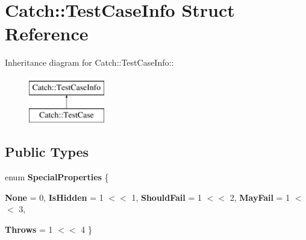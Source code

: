 \hypertarget{structCatch_1_1TestCaseInfo}{
\section{Catch::TestCaseInfo Struct Reference}
\label{structCatch_1_1TestCaseInfo}
}
Inheritance diagram for Catch::TestCaseInfo::\begin{figure}[H]
\begin{center}
\leavevmode
\includegraphics[height=2cm]{structCatch_1_1TestCaseInfo}
\end{center}
\end{figure}
\subsection*{Public Types}
\begin{DoxyCompactItemize}
\item 
enum {\bfseries SpecialProperties} \{ \par
{\bfseries None} =  0, 
{\bfseries IsHidden} =  1 $<$$<$ 1, 
{\bfseries ShouldFail} =  1 $<$$<$ 2, 
{\bfseries MayFail} =  1 $<$$<$ 3, 
\par
{\bfseries Throws} =  1 $<$$<$ 4
 \}
\end{DoxyCompactItemize}
